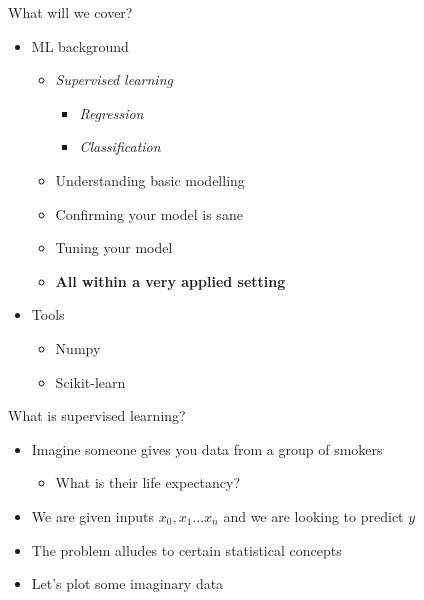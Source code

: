 \documentclass[obeyspaces,aspectratio=43]{beamer}
\providecommand{\tightlist}{%
  \setlength{\itemsep}{0pt}\setlength{\parskip}{0pt}}
\begin{document}
\begin{frame}{What will we cover?}

\begin{itemize}
\tightlist
\item
  ML background

  \begin{itemize}
  \tightlist
  \item
    \emph{Supervised learning}

    \begin{itemize}
    \tightlist
    \item
      \emph{Regression}
    \item
      \emph{Classification}
    \end{itemize}
  \item
    Understanding basic modelling
  \item
    Confirming your model is sane
  \item
    Tuning your model
  \item
    \textbf{All within a very applied setting}
  \end{itemize}
\item
  Tools

  \begin{itemize}
  \tightlist
  \item
    Numpy
  \item
    Scikit-learn
  \end{itemize}
\end{itemize}

\end{frame}

\begin{frame}{What is supervised learning?}

\begin{itemize}
\tightlist
\item
  Imagine someone gives you data from a group of smokers

  \begin{itemize}
  \tightlist
  \item
    What is their life expectancy?
  \end{itemize}
\item
  We are given inputs \(x_0, x_1...x_n\) and we are looking to predict
  \(y\)
\item
  The problem alludes to certain statistical concepts
\item
  Let's plot some imaginary data
\end{itemize}

\end{frame}
\end{document}
